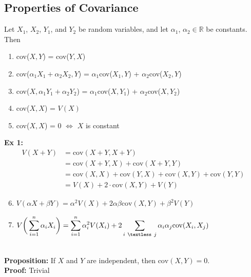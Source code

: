 \documentclass{article}
\newcommand{\R}{\mathbb{R}}
\newcommand{\lt}{\textless}
\newcommand{\x}{\cdot}
\newcommand{\al}{\alpha}
\newcommand{\be}{\beta}
\newcommand{\prop}{\textbf{Proposition: }}
\newcommand{\proo}{\textbf{Proof: }}
\newcommand{\exxi}{\textbf{Ex 1: }}
\begin{document}
\subsection{Properties of Covariance}
Let $X_{1}$, $X_{2}$, $Y_{1}$, and $Y_{2}$ be random variables, and let $\al_{1}$, $\al_{2} \in \R$ be constants. Then
\begin{enumerate}
	\item cov($X, Y$) = cov($Y, X$)
	\item cov($\al_{1}X_{1} + \al_{2}X_{2}, Y$) = $\al_{1}$cov($X_{1}, Y$) + $\al_{2}$cov($X_{2}, Y$)
	\item cov($X, \al_{1}Y_{1} + \al_{2}Y_{2}$) = $\al_{1}$cov($X, Y_{1}$) + $\al_{2}$cov($X, Y_{2}$)
	\item cov($X, X$) = $V(X)$
	\item cov($X, X$) = 0 $\iff$ $X$ is constant
\end{enumerate}
\exxi
\begin{align*}
	V(X+Y) &= \text{cov}(X+Y, X+Y)\\
			&= \text{cov}(X+Y, X ) + \text{cov}(X+Y, Y)\\
			&= \text{cov}(X, X) + \text{cov}(Y, X) + \text{cov}(X, Y) + \text{cov}(Y, Y)\\
			&= V(X) + 2\x\text{cov}(X, Y) + V(Y)
\end{align*}
\begin{enumerate}
\setcounter{enumi}{5}
	\item $V(\al X + \be Y) = \al^{2} V(X) + 2\al \be \text{cov}(X, Y) + \be^{2} V(Y)$
	\item $\displaystyle V\bigg(\sum_{i=1}^{n} \al_{i}X_{i}\bigg) = \sum_{i=1}^{n} \al_{i}^{2} V(X_{i}) + 2\sum_{i\ \lt\ j} \al_{i}\al_{j} \text{cov}(X_{i}, X_{j})$
\end{enumerate}
\ \\
\prop If $X$ and $Y$ are independent, then $\text{cov}(X, Y) = 0$.\\
\proo Trivial
\end{document}
